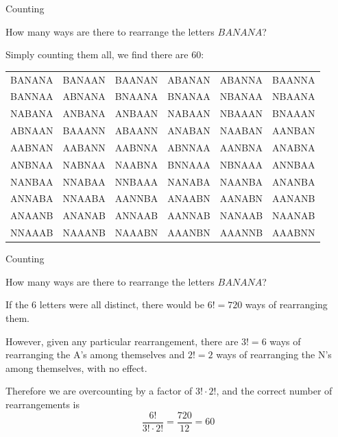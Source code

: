 \documentclass[xcolor=table]{beamer}
\begin{document}
\begin{frame}{Counting}
\begin{block}{}
How many ways are there to rearrange the letters $BANANA$?
\end{block}

\pause
\vspace{.3cm}
Simply counting them all, we find there are 60: \begin{center}
\hspace*{-.5cm}\begin{tabular}{cccccc}
BANANA & BANAAN & BAANAN & ABANAN & ABANNA & BAANNA  \\ 
BANNAA & ABNANA & BNAANA & BNANAA & NBANAA & NBAANA  \\ 
NABANA & ANBANA & ANBAAN & NABAAN & NBAAAN & BNAAAN  \\ 
ABNAAN & BAAANN & ABAANN & ANABAN & NAABAN & AANBAN  \\ 
AABNAN & AABANN & AABNNA & ABNNAA & AANBNA & ANABNA  \\ 
ANBNAA & NABNAA & NAABNA & BNNAAA & NBNAAA & ANNBAA  \\ 
NANBAA & NNABAA & NNBAAA & NANABA & NAANBA & ANANBA  \\ 
ANNABA & NNAABA & AANNBA & ANAABN & AANABN & AANANB  \\ 
ANAANB & ANANAB & ANNAAB & AANNAB & NANAAB & NAANAB \\ 
NNAAAB & NAAANB & NAAABN & AAANBN & AAANNB & AAABNN  \\ 
\end{tabular}
\end{center}
\end{frame}

\begin{frame}{Counting}
\begin{block}{}
How many ways are there to rearrange the letters $BANANA$?
\end{block}

\pause If the 6 letters were all distinct, there would be $6!=720$ ways of rearranging them. 

\vspace{.3cm}
\pause However, given any particular rearrangement, there are $3!=6$ ways of rearranging the A's among themselves and $2!=2$ ways of rearranging the N's among themselves, with no effect.

\pause\vspace{.3cm}
Therefore we are overcounting by a factor of $3! \cdot 2!$, and the correct number of rearrangements is
$$\frac{6!}{3! \cdot 2!} = \frac{720}{12}=60$$
\end{frame}
\end{document}
